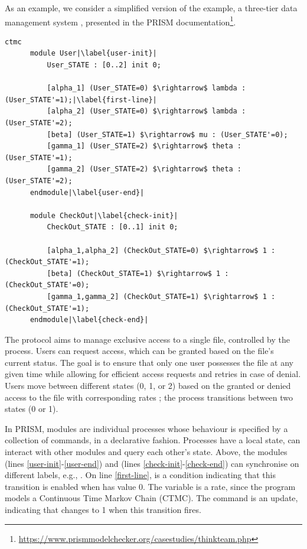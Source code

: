 As an example, we consider a simplified version of the
 example, a three-tier data management system
\cite{DBLP:journals/entcs/BeekMLGFS05}, presented in the PRISM
documentation\footnote{\url{https://www.prismmodelchecker.org/casestudies/thinkteam.php}}.
\begin{lstlisting}[style=prism-color,% caption={A PRISM example},captionpos=b,
	frame=none,label={example1},escapechar=|]
	  ctmc 
	  module User|\label{user-init}|
		  User_STATE : [0..2] init 0;
	  
		  [alpha_1] (User_STATE=0) $\rightarrow$ lambda : (User_STATE'=1);|\label{first-line}|
		  [alpha_2] (User_STATE=0) $\rightarrow$ lambda : (User_STATE'=2);
		  [beta] (User_STATE=1) $\rightarrow$ mu : (User_STATE'=0);
		  [gamma_1] (User_STATE=2) $\rightarrow$ theta : (User_STATE'=1);
		  [gamma_2] (User_STATE=2) $\rightarrow$ theta : (User_STATE'=2);
	  endmodule|\label{user-end}|
	  
	  module CheckOut|\label{check-init}|
		  CheckOut_STATE : [0..1] init 0;
	  
		  [alpha_1,alpha_2] (CheckOut_STATE=0) $\rightarrow$ 1 : (CheckOut_STATE'=1);
		  [beta] (CheckOut_STATE=1) $\rightarrow$ 1 : (CheckOut_STATE'=0);
		  [gamma_1,gamma_2] (CheckOut_STATE=1) $\rightarrow$ 1 : (CheckOut_STATE'=1);
	  endmodule|\label{check-end}|
  \end{lstlisting}
  The protocol aims to manage exclusive access to a single file,
  controlled by the  process. Users can request
  access, which can be granted based on the file's current status. The
  goal is to ensure that only one user possesses the file at any given
  time while allowing for efficient access requests and retries in
  case of denial. Users move between different states (0, 1, or 2)
  based on the granted or denied access to the file with corresponding
  rates ; the  process
  transitions between two states (0 or 1).

In PRISM, modules are individual processes whose behaviour is
specified by a collection of commands, in a declarative fashion.
Processes have a local state, can interact with other modules and
query each other's state. Above, the modules  (lines
\ref{user-init}-\ref{user-end}) and  (lines
\ref{check-init}-\ref{check-end}) can synchronise on different labels, e.g., 
. 
On line \ref{first-line},  is a condition
indicating that this transition is enabled when 
has value 0. The variable  is a rate, since the
program models a Continuous Time Markov Chain (CTMC). The command
 is an update, indicating that
 changes to 1 when this transition fires.

